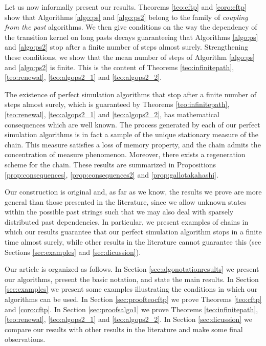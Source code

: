 \documentclass[a4paper]{article}
\begin{document}
Let us now informally present our results. Theorems \ref{teo:cftp} and \ref{coro:cftp} show that Algorithms \ref{algo:ps} and \ref{algo:ps2} belong to the family of \textit{coupling from the past} algorithms. We then give conditions on the way the dependency of the transition kernel on long pasts decays guaranteeing that Algorithms \ref{algo:ps} and \ref{algo:ps2} stop after a finite number of steps almost surely.  Strengthening these conditions, we show that the mean number of steps of Algorithm \ref{algo:ps} and \ref{algo:ps2} is finite. This is the content of Theorems \ref{teo:infinitepath}, \ref{teo:renewal}, \ref{teo:algops2_1} and \ref{teo:algops2_2}.

The existence of perfect simulation algorithms that stop after a finite number of steps almost surely, which is guaranteed by Theorems \ref{teo:infinitepath}, \ref{teo:renewal}, \ref{teo:algops2_1} and \ref{teo:algops2_2},  has mathematical consequences which are well known. The process generated by each of our perfect simulation algorithms is in fact a sample of the unique stationary measure of the chain. This measure satisfies a loss of memory property, and the chain admits the concentration of measure phenomenon. Moreover, there exists a regeneration scheme for the chain. These results are summarized in Propositions \ref{prop:consequences}, \ref{prop:consequences2} and \ref{prop:gallotakahashi}.

Our construction is original and, as far as we know, the results we prove are more general than those presented in the literature, since we allow unknown states within the possible past strings such that we may also deal with sparsely distributed past dependencies. In particular, we present examples of chains in which our results guarantee that our perfect simulation algorithm stops in a finite time almost surely, while other results in the literature cannot guarantee this (see Sections \ref{sec:examples} and \ref{sec:dicussion}).

Our article is organized as follows. In Section \ref{sec:algonotationresults} we present our algorithms, present the basic notation, and state the main results. In Section \ref{sec:examples} we present some examples illustrating the conditions in which our algorithms can be used. In Section \ref{sec:proofteocftp} we prove Theorems \ref{teo:cftp} and \ref{coro:cftp}. In Section \ref{sec:proofsalgo1} we prove Theorems \ref{teo:infinitepath}, \ref{teo:renewal}, \ref{teo:algops2_1} and \ref{teo:algops2_2}. In Section \ref{sec:dicussion} we compare our results with other results in the literature and make some final observations.
\end{document}
